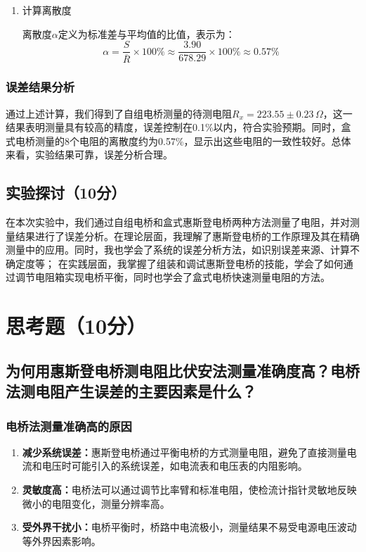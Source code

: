 \documentclass[]{../template/Report}%
\begin{document}
\begin{fullreportonly}
\begin{enumerate}
    \item 计算离散度

离散度$\alpha$定义为标准差与平均值的比值，表示为：
\begin{equation}
    \alpha = \frac{S}{\overline{R}} \times 100\% \approx \frac{3.90}{678.29} \times 100\% \approx 0.57\%
\end{equation}

\end{enumerate} 

\subsubsection{误差结果分析}
通过上述计算，我们得到了自组电桥测量的待测电阻$R_x = 223.55 \pm 0.23\,\Omega$，这一结果表明测量具有较高的精度，误差控制在0.1\%以内，符合实验预期。同时，盒式电桥测量的8个电阻的离散度约为0.57\%，显示出这些电阻的一致性较好。总体来看，实验结果可靠，误差分析合理。


\subsection{实验探讨（10分）}
在本次实验中，我们通过自组电桥和盒式惠斯登电桥两种方法测量了电阻，并对测量结果进行了误差分析。在理论层面，我理解了惠斯登电桥的工作原理及其在精确测量中的应用。同时，我也学会了系统的误差分析方法，如识别误差来源、计算不确定度等；
在实践层面，我掌握了组装和调试惠斯登电桥的技能，学会了如何通过调节电阻箱实现电桥平衡，同时也学会了盒式电桥快速测量电阻的方法。

\section{思考题（10分）}
\subsection{为何用惠斯登电桥测电阻比伏安法测量准确度高？电桥法测电阻产生误差的主要因素是什么？}

\subsubsection{电桥法测量准确高的原因}
\begin{enumerate}
    \item \textbf{减少系统误差：}惠斯登电桥通过平衡电桥的方式测量电阻，避免了直接测量电流和电压时可能引入的系统误差，如电流表和电压表的内阻影响。
    \item \textbf{灵敏度高：}电桥法可以通过调节比率臂和标准电阻，使检流计指针灵敏地反映微小的电阻变化，测量分辨率高。
    \item \textbf{受外界干扰小：}电桥平衡时，桥路中电流极小，测量结果不易受电源电压波动等外界因素影响。
\end{enumerate}

\end{fullreportonly}
\end{document}
